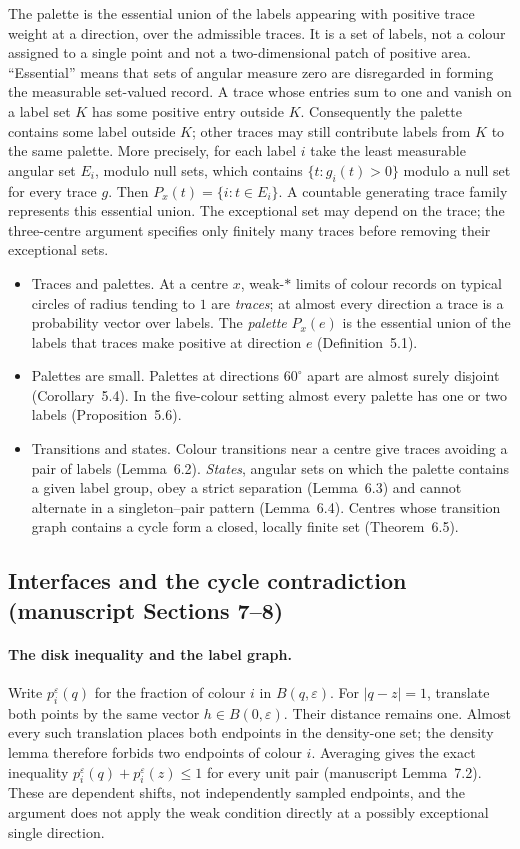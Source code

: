 \documentclass[11pt]{article}
\theoremstyle{definition}
\theoremstyle{remark}
\begin{document}
The palette is the essential union of the labels appearing with positive trace
weight at a direction, over the admissible traces. It is a set of labels, not a
colour assigned to a single point and not a two-dimensional patch of positive
area. ``Essential'' means that sets of angular measure zero are disregarded in
forming the measurable set-valued record. A trace whose entries sum to one and
vanish on a label set $K$ has some positive entry outside $K$. Consequently the
palette contains some label outside $K$; other traces may still contribute
labels from $K$ to the same palette.
More precisely, for each label $i$ take the least measurable angular set $E_i$,
modulo null sets, which contains $\{t:g_i(t)>0\}$ modulo a null set for every
trace $g$. Then $P_x(t)=\{i:t\in E_i\}$. A countable generating trace family
represents this essential union. The exceptional set may depend on the trace;
the three-centre argument specifies only finitely many traces before removing
their exceptional sets.

\begin{itemize}
\item Traces and palettes. At a centre $x$, weak-$*$ limits of colour records on typical circles of radius tending to $1$ are \emph{traces}; at almost every direction a trace is a probability vector over labels. The \emph{palette} $P_x(e)$ is the essential union of the labels that traces make positive at direction $e$ (Definition~5.1).
\item Palettes are small. Palettes at directions $60^\circ$ apart are almost surely disjoint (Corollary~5.4). In the five-colour setting almost every palette has one or two labels (Proposition~5.6).
\item Transitions and states. Colour transitions near a centre give traces avoiding a pair of labels (Lemma~6.2). \emph{States}, angular sets on which the palette contains a given label group, obey a strict separation (Lemma~6.3) and cannot alternate in a singleton--pair pattern (Lemma~6.4). Centres whose transition graph contains a cycle form a closed, locally finite set (Theorem~6.5).
\end{itemize}

\subsection{Interfaces and the cycle contradiction (manuscript Sections 7--8)}
\paragraph{The disk inequality and the label graph.}
Write $p_i^\varepsilon(q)$ for the fraction of colour $i$ in $B(q,\varepsilon)$.
For $|q-z|=1$, translate both points by the same vector
$h\in B(0,\varepsilon)$. Their distance remains one. Almost every such
translation places both endpoints in the density-one set; the density lemma
therefore forbids two endpoints of colour $i$. Averaging gives the exact
inequality $p_i^\varepsilon(q)+p_i^\varepsilon(z)\le1$ for every unit pair
(manuscript Lemma~7.2). These are dependent shifts, not independently sampled
endpoints, and the argument does not apply the weak condition directly at a
possibly exceptional single direction.
\end{document}
